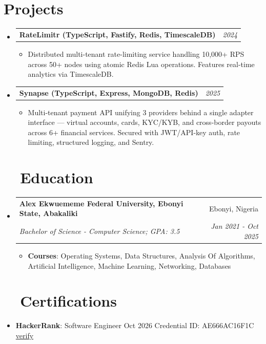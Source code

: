 \documentclass[a4paper,20pt]{article}
\makeatletter
\newcommand{\resumeItem}[2]{
  \item\small{
    \textbf{#1}{: #2}
  }
}
\newcommand{\resumeSubheading}[4]{
  \vspace{-1pt}\item[]
    \begin{tabular*}{0.97\textwidth}{l@{\extracolsep{\fill}}r}
      \textbf{#1} & #2 \\
      \textit{#3} & \textit{#4} \\
    \end{tabular*}\vspace{1pt}
}
\newcommand{\resumeProjectHeading}[2]{ %
  \vspace{4pt}\item[]
    \begin{tabular*}{0.97\textwidth}{l@{\extracolsep{\fill}}r}
      \textbf{#1} & \textit{#2} \\
    \end{tabular*}
    \vspace{0pt}
}
\newcommand{\resumeSubItem}[2]{\resumeItem{#1}{#2}\vspace{-8pt}}
\newcommand{\resumeSubHeadingListStart}{\begin{itemize}[leftmargin=*,topsep=4pt]}
\newcommand{\resumeSubHeadingListEnd}{\end{itemize}}
\newcommand{\resumeItemListStart}{\begin{itemize}[topsep=0pt,itemsep=0pt,parsep=0pt]}
\newcommand{\resumeItemListEnd}{\end{itemize}}
\makeatother
\begin{document}
\section{Projects}
\resumeSubHeadingListStart
\resumeProjectHeading{RateLimitr (TypeScript, Fastify, Redis, TimescaleDB)}{2024}
  \resumeItemListStart
    \item\small{Distributed multi-tenant rate-limiting service handling 10,000+ RPS across 50+ nodes using atomic Redis Lua operations. Features real-time analytics via TimescaleDB.}
  \resumeItemListEnd
\resumeProjectHeading{Synapse (TypeScript, Express, MongoDB, Redis)}{2025}
  \resumeItemListStart
    \item\small{Multi-tenant payment API unifying 3 providers behind a single adapter interface — virtual accounts, cards, KYC/KYB, and cross-border payouts across 6+ financial services. Secured with JWT/API-key auth, rate limiting, structured logging, and Sentry.}
  \resumeItemListEnd
\resumeSubHeadingListEnd

\section{~~Education}
  \resumeSubHeadingListStart
    \resumeSubheading
      {Alex Ekwuememe Federal University, Ebonyi State, Abakaliki}{Ebonyi, Nigeria}
      {Bachelor of Science - Computer Science;  GPA: 3.5}{Jan 2021 - Oct 2025}
    \resumeItemListStart
      \resumeItem{Courses}{Operating Systems, Data Structures, Analysis Of Algorithms, Artificial Intelligence, Machine Learning, Networking, Databases}
    \resumeItemListEnd
    \resumeSubHeadingListEnd

	\vspace{8pt}
	\section{~~Certifications}
	\resumeSubHeadingListStart
	\resumeSubItem{HackerRank}{Software Engineer \textbullet{} Oct 2026 \textbullet{} Credential ID: AE666AC16F1C \textbullet{} \href{https://www.hackerrank.com/certificates/e4382188f72a}{verify}}
	\resumeSubHeadingListEnd
\end{document}
